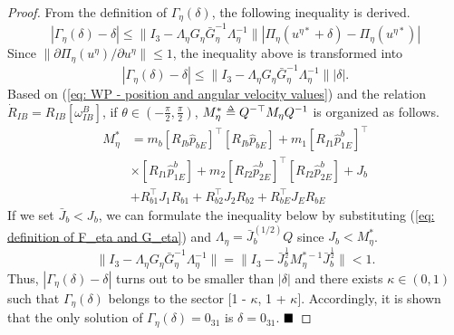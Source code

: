 \documentclass[letterpaper, 10 pt, conference]{ieeeconf}  %
\def\delequal{\mathrel{\ensurestackMath{\stackon[1pt]{=}{\scriptscriptstyle\Delta}}}}
\theoremstyle{definition}
\begin{document}
\begin{proof}
From the definition of $\Gamma_{\eta}(\delta)$, the following inequality is derived.
\begin{equation*}
    | \Gamma_{\eta}(\delta) - \delta | \leq \| I_{3} - \Lambda_{\eta}G_{\eta}\bar{G}_{\eta}^{-1}\Lambda_{\eta}^{-1} \| | \Pi_{\eta}(u^{\eta *} + \delta ) - \Pi_{\eta}(u^{\eta *}) |
\end{equation*}
Since $\| \partial \Pi_{\eta}(u^{\eta}) / \partial u^{\eta} \| \leq 1$, the inequality above is transformed into
\begin{equation*}
    | \Gamma_{\eta}(\delta) - \delta | \leq \| I_{3} - \Lambda_{\eta}G_{\eta}\bar{G}_{\eta}^{-1}\Lambda_{\eta}^{-1} \| | \delta |.
\end{equation*}
Based on (\ref{eq: WP - position and angular velocity values}) and the relation $\dot{R}_{I B} = R_{I B}[\omega^{B}_{I B}]$, if $\theta \in (-\frac{\pi}{2}, \frac{\pi}{2})$, $M^{*}_{\eta} \delequal Q^{-\top}M_{\eta}Q^{-1}$ is organized as follows.
\begin{equation} \label{eq: analyzed form of M_eta}
\begin{split}
    M^{*}_{\eta} &= m_b [R_{I b}\hat{p}_{b E}]^{\top}[R_{I b}\hat{p}_{b E}] + m_1 [R_{I1}\hat{p}^b_{1E}]^{\top}\\&\times [R_{I1}\hat{p}^b_{1E}] + m_2 [R_{I2}\hat{p}^b_{2E}]^{\top} [R_{I2}\hat{p}^b_{2E}]+ J_b \\ &+ R_{b 1}^{\top} J_1 R_{b 1} + R_{b 2}^{\top} J_2 R_{b 2} + R_{b E}^{\top} J_E R_{b E}
    \end{split}
\end{equation}
If we set $\bar{J}_b < J_b$, we can formulate the inequality below by substituting (\ref{eq: definition of F_eta and G_eta}) and $\Lambda_{\eta} = \bar{J}_b^{(1/2)}Q$ since $J_b < M^{*}_{\eta}$. 
\begin{equation}
    \| I_{3} - \Lambda_{\eta}G_{\eta}\bar{G}_{\eta}^{-1}\Lambda_{\eta}^{-1} \| = \| I_3 - \bar{J}_b^{\frac{1}{2}} M_{\eta}^{* -1}\bar{J}_b^{\frac{1}{2}} \| < 1.
\end{equation}
Thus, $| \Gamma_{\eta}(\delta) - \delta |$ turns out to be smaller than $| \delta |$ and there exists $\kappa \in (0, 1)$ such that $\Gamma_{\eta}(\delta)$ belongs to the sector [1 - $\kappa$, 1 + $\kappa$]. Accordingly, it is shown that the only solution of $\Gamma_{\eta}(\delta) = 0_{3 1}$ is $\delta = 0_{3 1}$. $\hfill \blacksquare$
\end{proof}
\end{document}
